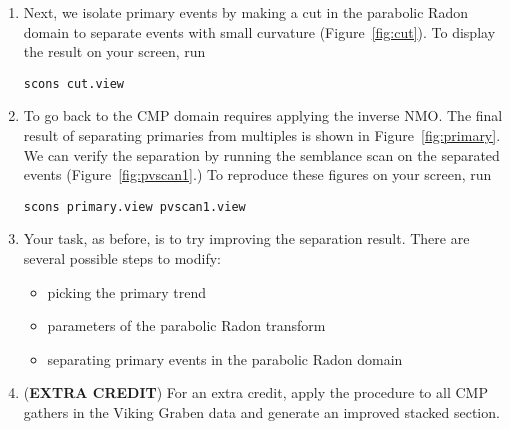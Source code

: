 \begin{enumerate}

\item Next, we isolate primary events by making a cut in the parabolic Radon domain to separate events with small curvature (Figure~\ref{fig:cut}). To display the result on your screen, run
\begin{verbatim}
scons cut.view
\end{verbatim}


\item To go back to the CMP domain requires applying the inverse NMO. The final result of separating primaries from multiples is shown in Figure~\ref{fig:primary}. We can verify the separation by running the semblance scan on the separated events (Figure~\ref{fig:pvscan1}.) To reproduce these figures on your screen, run
\begin{verbatim}
scons primary.view pvscan1.view
\end{verbatim}

\item Your task, as before, is to try improving the separation result. There are several possible steps to modify:
\begin{itemize}
\item picking the primary trend
\item parameters of the parabolic Radon transform
\item separating primary events in the parabolic Radon domain
\end{itemize}

\item (\textbf{EXTRA CREDIT}) For an extra credit, apply the procedure to all CMP gathers in the Viking Graben data and generate an improved stacked section.

\end{enumerate}

\lstset{language=python,numbers=left,numberstyle=\tiny,showstringspaces=false}


